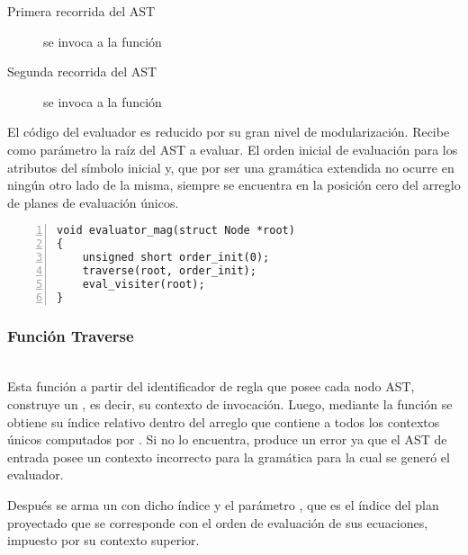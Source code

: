 \begin{description}
\item [Primera recorrida del AST] se invoca a la función

\item [Segunda recorrida del AST] se invoca a la función
\end{description}

El código del evaluador es reducido por su gran nivel de modularización. Recibe como parámetro la raíz del AST a evaluar. El orden inicial de evaluación para los atributos del símbolo inicial y, que por ser una gramática extendida no ocurre en ningún otro lado de la misma, siempre se encuentra en la posición cero del arreglo de planes de evaluación únicos.

\begin{lstlisting}[numbers=left, columns=fullflexible, linewidth=6.8cm]
void evaluator_mag(struct Node *root)
{
    unsigned short order_init(0);
    traverse(root, order_init);
    eval_visiter(root);
}
\end{lstlisting}

\subsubsection{Función Traverse}
\\

Esta función a partir del identificador de regla que posee cada nodo AST, construye un , es decir, su contexto de invocación. Luego, mediante la función  se obtiene su índice relativo dentro del arreglo que contiene a todos los contextos únicos computados por \maggen. Si no lo encuentra, produce un error ya que el AST de entrada posee un contexto incorrecto para la gramática para la cual se generó el evaluador.

Después se arma un  con dicho índice y el parámetro , que es el índice del plan proyectado que se corresponde con el orden de evaluación de sus ecuaciones, impuesto por su contexto superior.

